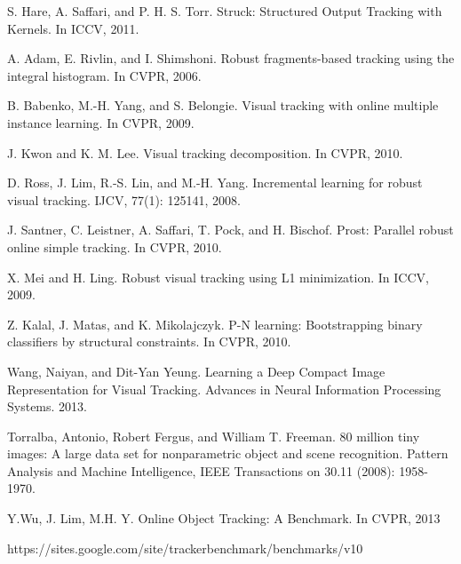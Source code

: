 \documentclass{article}
\begin{document}
\begin{thebibliography}{99}
S. Hare, A. Saffari, and P. H. S. Torr. Struck: Structured Output
Tracking with Kernels. In ICCV, 2011.

A. Adam, E. Rivlin, and I. Shimshoni. Robust fragments-based tracking using the integral histogram. In CVPR, 2006.

B. Babenko, M.-H. Yang, and S. Belongie. Visual tracking with online multiple instance learning. In CVPR, 2009.

J. Kwon and K. M. Lee. Visual tracking decomposition. In CVPR, 2010.

D. Ross, J. Lim, R.-S. Lin, and M.-H. Yang. Incremental learning for robust visual tracking. IJCV, 77(1): 125141, 2008.

J. Santner, C. Leistner, A. Saffari, T. Pock, and H. Bischof. Prost: Parallel robust online simple tracking. In CVPR, 2010.

X. Mei and H. Ling. Robust visual tracking using L1 minimization. In ICCV, 2009.

Z. Kalal, J. Matas, and K. Mikolajczyk. P-N learning: Bootstrapping binary classifiers by structural constraints. In CVPR, 2010.

Wang, Naiyan, and Dit-Yan Yeung. Learning a Deep Compact Image Representation for Visual Tracking. Advances in Neural Information Processing Systems. 2013.

Torralba, Antonio, Robert Fergus, and William T. Freeman. 80 million tiny images: A large data set for nonparametric object and scene recognition. Pattern Analysis and Machine Intelligence, IEEE Transactions on 30.11 (2008): 1958-1970.

Y.Wu, J. Lim, M.H. Y. Online Object Tracking: A Benchmark. In CVPR, 2013

https://sites.google.com/site/trackerbenchmark/benchmarks/v10

\end{thebibliography}
\end{document}
